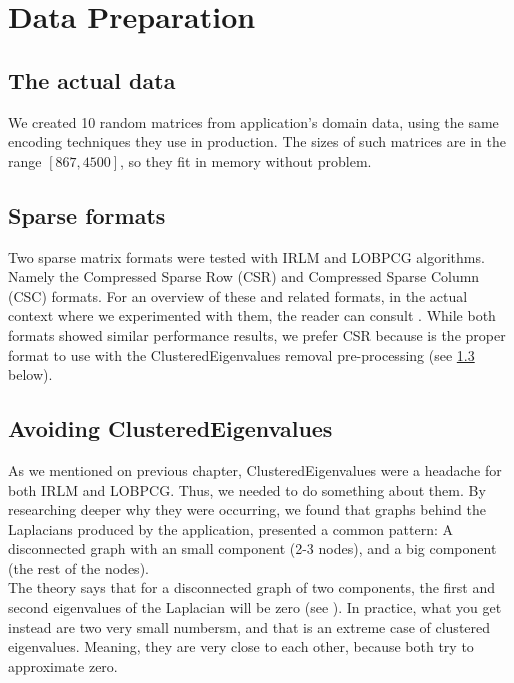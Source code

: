 \section{Data Preparation}

\subsection{The actual data}
We created 10 random matrices from application's domain data, using
the same encoding techniques they use in production. The sizes of such
matrices are in the range $[867,4500]$, so they fit in memory without
problem. \\

\subsection{Sparse formats}
Two sparse matrix formats were tested with \gls{IRLM} and
\gls{LOBPCG} 
algorithms. Namely the Compressed Sparse Row (CSR) and Compressed
Sparse Column (CSC) formats. For an overview of these and related
formats, in the actual context where we experimented with them, the
reader can consult \cite{johansson15}. While both formats showed
similar performance results, we prefer CSR because is the proper
format to use with the \gls{ClusteredEigenvalues} removal pre-processing (see
\cref{sub:avoid-clust-eigv} below). 

\subsection{Avoiding \gls{ClusteredEigenvalues}}
\label{sub:avoid-clust-eigv}

As we mentioned on previous chapter, \gls{ClusteredEigenvalues} were a
headache for both \gls{IRLM} and \gls{LOBPCG}. Thus, we needed to do something
about them. By researching deeper why they were occurring, we found
that graphs behind the \gls{Laplacian}s produced by the
application, presented a common pattern: A disconnected graph with an
small component (2-3 nodes), and a big component (the rest of the
nodes). \\

The theory says that for a disconnected graph of two components, the
first and second eigenvalues of the \gls{Laplacian} will be zero (see
\cite{luxburg07}). In practice, what you get instead are two very
small numbersm, and that is an extreme case of clustered
eigenvalues. Meaning, they are very close to each other, because both try to
approximate zero. \\

